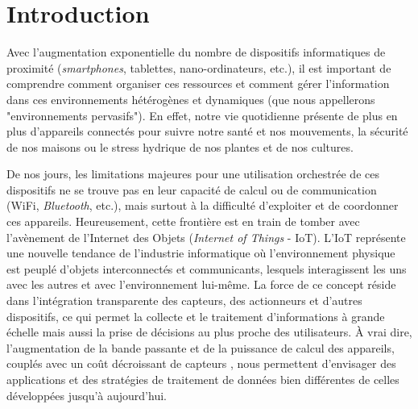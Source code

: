 \begin{resume}
	
	
	
	
\end{resume}

\section{Introduction}

Avec l'augmentation exponentielle du nombre de dispositifs informatiques de proximité (\textit{smartphones}, tablettes, nano-ordinateurs, etc.),  il est important de comprendre comment organiser ces ressources et comment gérer l'information dans ces environnements hétérogènes et dynamiques (que nous appellerons "environnements pervasifs"). 
En effet, notre vie quotidienne présente de plus en plus d'appareils connectés pour suivre notre santé et nos mouvements, la sécurité de nos maisons ou le stress hydrique de nos plantes et de nos cultures. 

De nos jours, les limitations majeures pour une utilisation orchestrée de ces dispositifs ne se trouve pas en leur capacité de calcul ou de communication (WiFi, \textit{Bluetooth}, etc.), mais surtout à la difficulté d'exploiter et de coordonner ces appareils. Heureusement, cette frontière est en train de tomber avec l'avènement de l'Internet des Objets (\textit{Internet of Things} - IoT). L'IoT représente une nouvelle tendance de l'industrie informatique où l'environnement physique est peuplé d'objets interconnectés et communicants, lesquels interagissent les uns avec les autres et avec l'environnement lui-même. La force de ce concept réside dans l'intégration transparente des capteurs, des actionneurs et d'autres dispositifs, ce qui permet la collecte et le traitement d'informations à grande échelle mais aussi la prise de décisions au plus proche des utilisateurs. À vrai dire, l'augmentation de la bande passante et de la puissance de calcul des appareils, couplés avec un coût décroissant de capteurs \cite{Jones2014}, nous permettent d'envisager des applications et des stratégies de traitement de données bien différentes de celles développées jusqu'à aujourd'hui.


